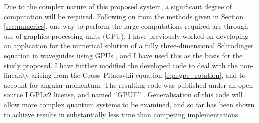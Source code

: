 
Due to the complex nature of this proposed system, a significant degree of computation will be required. Following on from the methods given in Section \ref{sec:numerics}, one way to perform the large computations required are through use of graphics processing units (GPU). I have previously worked on developing an application for the numerical solution of a fully three-dimensional Schr\"{o}dinger equation in waveguides using GPUs \cite{AO:Morgan_pra_2013}, and I have used this as the basis for the study proposed. I have further modified the developed code to deal with the non-linearity arising from the Gross--Pitaesvkii equation \eqref{eqn:gpe_rotation}, and to account for angular momentum. The resulting code was published under an open-source LGPLv2 license, and named ``GPUE'' \cite{NUM:gpue}. Generalisation of this code will allow more complex quantum systems to be examined, and so far has been shown to achieve results in substantially less time than competing implementations.


